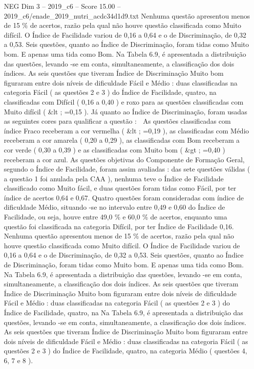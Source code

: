 \begin{textsample}{NEG Dim 3 – 2019\_c6 – Score 15.00 – 2019\_c6/enade\_2019\_nutri\_acdc34d1d9.txt}
Nenhuma questão apresentou menos de 15 \% de acertos, razão pela qual não houve questão classificada como Muito difícil.
O Índice de Facilidade variou de 0,16 a 0,64 e o de Discriminação, de 0,32 a 0,53.
Seis questões, quanto ao Índice de Discriminação, foram tidas como Muito bom.
E apenas uma tida como Bom.
Na Tabela 6.9, é apresentada a distribuição das questões, levando -se em conta, simultaneamente, a classificação dos dois índices.
As seis questões que tiveram Índice de Discriminação Muito bom figuraram entre dois níveis de dificuldade Fácil e Médio : duas classificadas na categoria Fácil ( as questões 2 e 3 ) do Índice de Facilidade, quatro, na classificadas com Difícil ( 0,16 a 0,40 ) e roxo para as questões classificadas com Muito difícil ( \&lt ; =0,15 ).
Já quanto ao Índice de Discriminação, foram usadas as seguintes cores para qualificar a questão :  As questões classificadas com índice Fraco receberam a cor vermelha ( \&lt ; =0,19 ), as classificadas com Médio receberam a cor amarela ( 0,20 a 0,29 ), as classificadas com Bom receberam a cor verde ( 0,30 a 0,39 ) e as classificadas com Muito bom ( \&gt ; =0,40 ) receberam a cor azul.
As questões objetivas do Componente de Formação Geral, segundo o Índice de Facilidade, foram assim avaliadas : das sete questões válidas ( a questão 1 foi anulada pela CAA ), nenhuma teve o Índice de Facilidade classificado como Muito fácil, e duas questões foram tidas como Fácil, por ter índice de acertos 0,64 e 0,67.
Quatro questões foram consideradas com índice de dificuldade Médio, situando -se no intervalo entre 0,49 e 0,60 do Índice de Facilidade, ou seja, houve entre 49,0 \% e 60,0 \% de acertos, enquanto uma questão foi classificada na categoria Difícil, por ter Índice de Facilidade 0,16.
Nenhuma questão apresentou menos de 15 \% de acertos, razão pela qual não houve questão classificada como Muito difícil.
O Índice de Facilidade variou de 0,16 a 0,64 e o de Discriminação, de 0,32 a 0,53.
Seis questões, quanto ao Índice de Discriminação, foram tidas como Muito bom.
E apenas uma tida como Bom.
Na Tabela 6.9, é apresentada a distribuição das questões, levando -se em conta, simultaneamente, a classificação dos dois índices.
As seis questões que tiveram Índice de Discriminação Muito bom figuraram entre dois níveis de dificuldade Fácil e Médio : duas classificadas na categoria Fácil ( as questões 2 e 3 ) do Índice de Facilidade, quatro, na Na Tabela 6.9, é apresentada a distribuição das questões, levando -se em conta, simultaneamente, a classificação dos dois índices.
As seis questões que tiveram Índice de Discriminação Muito bom figuraram entre dois níveis de dificuldade Fácil e Médio : duas classificadas na categoria Fácil ( as questões 2 e 3 ) do Índice de Facilidade, quatro, na categoria Médio ( questões 4, 6, 7 e 8 ).

\end{textsample}
